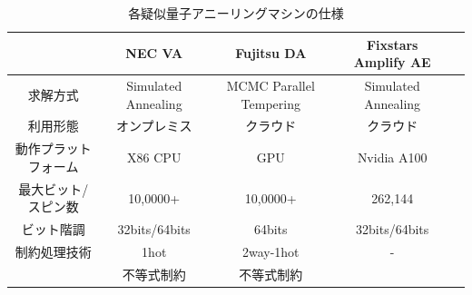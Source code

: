 \documentclass[submit,techrep,noauthor]{ipsj}
\begin{document}
\newlength{\myheight}
\setlength{\myheight}{0.8cm}

\begin{table}[htb]
\centering
  \caption{各疑似量子アニーリングマシンの仕様}
    \begin{tabular}{|c||c|c|c|c}
      \hline
      \parbox[c][\myheight][c]{0cm}{}
      & {NEC VA} & {Fujitsu DA} & {Fixstars Amplify AE}\\ \hline \hline
      求解方式 & Simulated Annealing & MCMC Parallel Tempering & Simulated Annealing\\ \hline
      利用形態 & オンプレミス & クラウド & クラウド\\ \hline
      動作プラットフォーム & X86 CPU & GPU & Nvidia A100\\ \hline
      最大ビット/スピン数 & 10,0000+ & 10,0000+ & 262,144\\ \hline
      ビット階調 & 32bits/64bits & 64bits & 32bits/64bits\\ \hline
      制約処理技術 & 1hot & 2way-1hot  & -\\ 
      {} & 不等式制約 & 不等式制約 & {}\\ \hline
  \end{tabular}
\label{table_spec}
\end{table}

\end{document}
